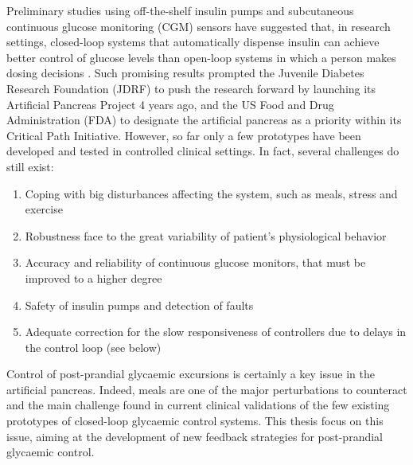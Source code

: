 Preliminary studies using off-the-shelf insulin pumps and subcutaneous continuous glucose monitoring (CGM) sensors have suggested that, in research settings, closed-loop systems that automatically dispense insulin can achieve better control of glucose levels than open-loop systems in which a person makes dosing decisions \cite{steil2006feasibility}. Such promising results prompted the Juvenile Diabetes Research Foundation (JDRF) to push the research forward by launching its Artificial Pancreas Project 4 years ago, and the US Food and Drug Administration (FDA) to designate the artificial pancreas as a priority within its Critical Path Initiative. However, so far only a few prototypes have been developed and tested in controlled clinical settings. In fact, several challenges do still exist:
\begin{enumerate}
	\item Coping with big disturbances affecting the system, such as meals, stress and exercise
	\item Robustness face to the great variability of patient's physiological behavior
	\item Accuracy and reliability of continuous glucose monitors, that must be improved to a higher degree
	\item Safety of insulin pumps and detection of faults
	\item Adequate correction for the slow responsiveness of controllers due to delays in the control loop (see below)
\end{enumerate}

Control of post-prandial glycaemic excursions is certainly a key issue in the artificial pancreas. Indeed, meals are one of the major perturbations to counteract and the main challenge found in current clinical validations of the few existing prototypes of closed-loop glycaemic control systems. This thesis focus on this issue, aiming at the development of new feedback strategies for post-prandial glycaemic control. 


